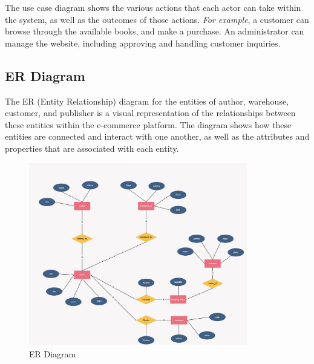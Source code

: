 \documentclass[12pt]{article}
\begin{document}
The use case diagram shows the various actions that each actor can take within the system, as well as the outcomes of those actions. \textit{For example}, a customer can browse through the available books, and make a purchase. An administrator can manage the website, including approving and handling customer inquiries.

\newpage
\subsection{ER Diagram}

The ER (Entity Relationship) diagram for the entities of author, warehouse, customer, and publisher is a visual representation of the relationships between these entities within the e-commerce platform. The diagram shows how these entities are connected and interact with one another, as well as the attributes and properties that are associated with each entity.

\begin{figure}[h]
\centering
\includegraphics[width=0.85\textwidth]{er_diagram.png}
\caption{ER Diagram}
\end{figure}
\end{document}
